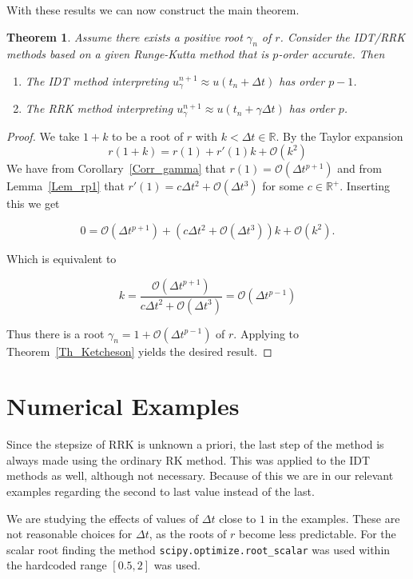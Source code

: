 \documentclass{article}
\newtheorem{theorem}{Theorem}[section]
\begin{document}
    \vspace*{5mm}
    With these results we can now construct the main theorem.
    \begin{theorem}\label{Th_main}
        Assume there exists a positive root \(\gamma_n\) of \(r\). Consider the IDT/RRK methods based on a given Runge-Kutta method that is \(p\)-order accurate. Then
        \begin{enumerate}
            \item The IDT method interpreting \(u_{\gamma}^{n+1} \approx u(t_n + \Delta t)\) has order \(p-1\).
            \item The RRK method interpreting \(u_{\gamma}^{n+1} \approx u(t_n + \gamma \Delta t)\) has order \(p\).
        \end{enumerate}
    \end{theorem}
    \begin{proof}
        We take \(1+k\) to be a root of \(r\) with \(k<\Delta t \in \mathbb{R}\). By the Taylor expansion
        \[r(1+k) = r(1) + r'(1)k + \mathcal{O}(k^2)\]
        We have from Corollary~\ref{Corr_gamma} that \(r(1) = \mathcal{O}(\Delta t^{p+1})\) and from Lemma~\ref{Lem_rp1} that \(r'(1)=c\Delta t^2 + \mathcal{O}(\Delta t^{3})\) for some \(c \in \mathbb{R^+}\). Inserting this we get

        \[0 = \mathcal{O}(\Delta t^{p+1}) + (c\Delta t^2 + \mathcal{O}(\Delta t^{3})) k + \mathcal{O}(k^2).\]

        Which is equivalent to

        \[k = \frac{\mathcal{O}(\Delta t^{p+1})}{c\Delta t^2 + \mathcal{O}(\Delta t^{3})} = \mathcal{O}(\Delta t^{p-1})\]

        Thus there is a root \(\gamma_n = 1 + \mathcal{O}(\Delta t^{p-1})\) of \(r\). Applying to Theorem~\ref{Th_Ketcheson} yields the desired result.
    \end{proof}


\section{Numerical Examples}

    Since the stepsize of RRK is unknown a priori, the last step of the method is always made using the ordinary RK method. This was applied to the IDT methods as well, although not necessary.
    Because of this we are in our relevant examples regarding the second to last value instead of the last.

    \vspace*{5mm}
    We are studying the effects of values of \(\Delta t\) close to \(1\) in the examples. These are not reasonable choices for \(\Delta t\), as the roots of \(r\) become less predictable. For the scalar root finding the method \texttt{scipy.optimize.root\_scalar} was used within the hardcoded range \( \left[0.5,2\right] \) was used.
\end{document}
